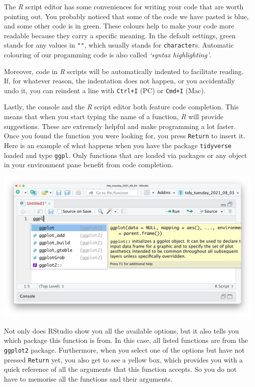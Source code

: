 \documentclass[
  letterpaper,
  DIV=11,
  numbers=noendperiod]{scrreprt}
\begin{document}
The \emph{R} script editor has some conveniences for writing your code
that are worth pointing out. You probably noticed that some of the code
we have pasted is blue, and some other code is in green. These colours
help to make your code more readable because they carry a specific
meaning. In the default settings, green stands for any values in
\texttt{""}, which usually stands for \texttt{character}s. Automatic
colouring of our progamming code is also called \emph{`syntax
highlighting'}.

Moreover, code in \emph{R} scripts will be automatically indented to
facilitate reading. If, for whatever reason, the indentation does not
happen, or you accidentally undo it, you can reindent a line with
\texttt{Ctrl+I} (PC) or \texttt{Cmd+I} (Mac).

Lastly, the console and the \emph{R} script editor both feature code
completion. This means that when you start typing the name of a
function, \emph{R} will provide suggestions. These are extremely helpful
and make programming a lot faster. Once you found the function you were
looking for, you press \texttt{Return} to insert it. Here is an example
of what happens when you have the package \texttt{tidyverse} loaded and
type \texttt{ggpl}. Only functions that are loaded via packages or any
object in your environment pane benefit from code completion.

\includegraphics{images/chapter_06_img/02_r_script/02_r_script_code_completion.png}

Not only does RStudio show you all the available options, but it also
tells you which package this function is from. In this case, all listed
functions are from the \texttt{ggplot2} package. Furthermore, when you
select one of the options but have not pressed \texttt{Return} yet, you
also get to see a yellow box, which provides you with a quick reference
of all the arguments that this function accepts. So you do not have to
memorise all the functions and their arguments.
\end{document}
